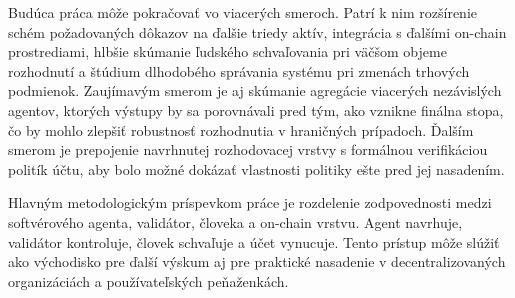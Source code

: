 Budúca práca môže pokračovať vo viacerých smeroch. Patrí k nim rozšírenie schém požadovaných dôkazov na ďalšie triedy aktív, integrácia s ďalšími on-chain prostrediami, hlbšie skúmanie ľudského schvaľovania pri väčšom objeme rozhodnutí a štúdium dlhodobého správania systému pri zmenách trhových podmienok. Zaujímavým smerom je aj skúmanie agregácie viacerých nezávislých agentov, ktorých výstupy by sa porovnávali pred tým, ako vznikne finálna stopa, čo by mohlo zlepšiť robustnosť rozhodnutia v hraničných prípadoch. Ďalším smerom je prepojenie navrhnutej rozhodovacej vrstvy s formálnou verifikáciou politík účtu, aby bolo možné dokázať vlastnosti politiky ešte pred jej nasadením.

Hlavným metodologickým príspevkom práce je rozdelenie zodpovednosti medzi softvérového agenta, validátor, človeka a on-chain vrstvu. Agent navrhuje, validátor kontroluje, človek schvaľuje a účet vynucuje. Tento prístup môže slúžiť ako východisko pre ďalší výskum aj pre praktické nasadenie v decentralizovaných organizáciách a používateľských peňaženkách.
